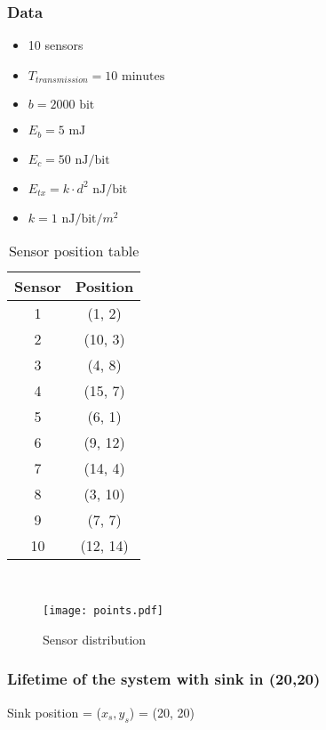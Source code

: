 \subsubsection{Data}
\begin{itemize}
	\item 10 sensors
	\item $T_{transmission} = 10 \text{ minutes}$
	\item $b = 2000 \text{ bit}$
	\item $E_b = 5 \text{ mJ}$
	\item $E_c = 50 \text{ nJ/bit}$
	\item $E_{tx} = k \cdot d^2 \text{ nJ/bit}$
	\item $k = 1 \text{ nJ/bit/$m^2$}$
\end{itemize}
\begin{table}[H]
\centering 
\begin{tabular}{| c | c |}
	\hline 
	\rowcolor{bluepoli!40}
	\textbf{Sensor} & \textbf{Position}\T\B \\
	\hline 
	1 & (1, 2) \T\B\\
	2 &(10, 3) \T\B\\
	3 & (4, 8) \T\B\\
	4 & (15, 7) \T\B\\
	5  & (6, 1) \T\B\\
	6  & (9, 12) \T\B\\
	7  & (14, 4) \T\B\\
	8  & (3, 10) \T\B\\
	9  & (7, 7) \T\B\\
	10  & (12, 14) \T\B\\
	\hline
\end{tabular}
\\[10pt]
\caption{Sensor position table}
\label{table:sensor_position_table}
\end{table}

\begin{figure}[H]
    \centering
    \texttt{[image: points.pdf]}
    \caption{Sensor distribution}
    \label{fig:Sensor_distribution}
\end{figure}


\subsubsection{Lifetime of the system with sink in (20,20)}
Sink position = ($x_s, y_s$) = (20, 20)\\

